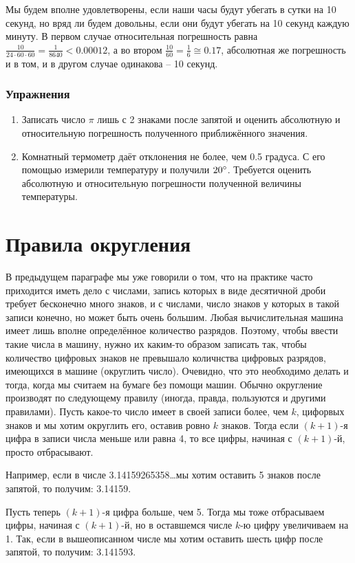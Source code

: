 Мы будем вполне удовлетворены, если наши часы будут убегать в сутки на 10
секунд, но вряд ли будем довольны, если они будут убегать на 10 секунд каждую
минуту. В первом случае относительная погрешность равна $\frac{10}{24 \cdot 60
\cdot 60} = \frac{1}{8640} < 0.00012$, а во втором $\frac{10}{60} = \frac{1}{6}
\cong 0.17$, абсолютная же погрешность и в том, и в другом случае одинакова --
10 секунд.

\subsubsection{Упражнения}
\begin{enumerate}
	\item Записать число $\pi$ лишь с 2 знаками после запятой и оценить
		абсолютную и относительную погрешность полученного
		приближённого значения.
	\item Комнатный термометр даёт отклонения не более, чем 0.5 градуса. С
		его помощью измерили температуру и получили $20\degree$.
		Требуется оценить абсолютную и относительную погрешности
		полученной величины температуры.
\end{enumerate}

\section{Правила округления}
В предыдущем параграфе мы уже говорили о том, что на практике часто приходится
иметь дело с числами, запись которых в виде десятичной дроби требует бесконечно
много знаков, и с числами, число знаков у которых в такой записи конечно, но
может быть очень большим. Любая вычислительная машина имеет лишь вполне
определённое количество разрядов. Поэтому, чтобы ввести такие числа в машину,
нужно их каким-то образом записать так, чтобы количество цифровых знаков не
превышало количнства цифровых разрядов, имеющихся в машине (округлить число).
Очевидно, что это необходимо делать и тогда, когда мы считаем на бумаге без
помощи машин. Обычно округление производят по следующему правилу (иногда,
правда, пользуются и другими правилами). Пусть какое-то число имеет в своей
записи более, чем $k$, цифорвых знаков и мы хотим округлить его, оставив ровно
$k$ знаков. Тогда если $(k + 1)$-я цифра в записи числа меньше или равна 4, то
все цифры, начиная с $(k + 1)$-й, просто отбрасывают.

Например, если в числе 3.14159265358\ldots мы хотим оставить 5 знаков после
запятой, то получим: 3.14159.

Пусть теперь $(k + 1)$-я цифра больше, чем 5. Тогда мы тоже отбрасываем цифры,
начиная с $(k + 1)$-й, но в оставшемся числе $k$-ю цифру увеличиваем на 1.
Так, если в вышеописанном числе мы хотим оставить шесть цифр после запятой, то
получим: 3.141593.

